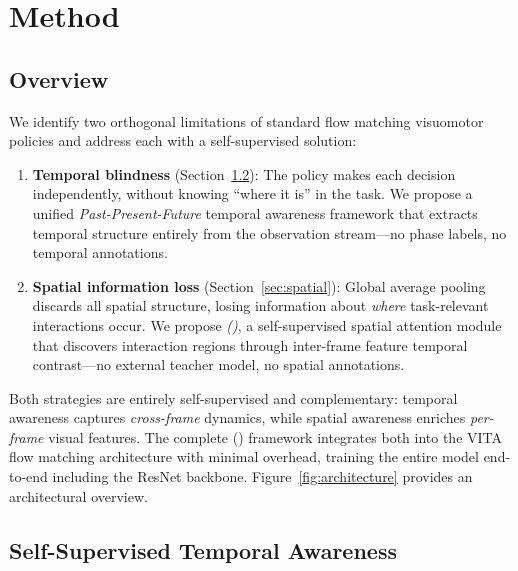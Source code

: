 \section{Method}
\label{sec:method}

\subsection{Overview}
\label{sec:method_overview}

We identify two orthogonal limitations of standard flow matching visuomotor policies and address each with a self-supervised solution:

\begin{enumerate}[leftmargin=*,itemsep=4pt]
    \item \textbf{Temporal blindness} (Section~\ref{sec:temporal}): The policy makes each decision independently, without knowing ``where it is'' in the task. We propose a unified \emph{Past-Present-Future} temporal awareness framework that extracts temporal structure entirely from the observation stream---no phase labels, no temporal annotations.

    \item \textbf{Spatial information loss} (Section~\ref{sec:spatial}): Global average pooling discards all spatial structure, losing information about \emph{where} task-relevant interactions occur. We propose \emph{\fasafull{} (\fasa{})}, a self-supervised spatial attention module that discovers interaction regions through inter-frame feature temporal contrast---no external teacher model, no spatial annotations.
\end{enumerate}

Both strategies are entirely self-supervised and complementary: temporal awareness captures \emph{cross-frame} dynamics, while spatial awareness enriches \emph{per-frame} visual features. The complete \method{} (\methodfull{}) framework integrates both into the VITA flow matching architecture with minimal overhead, training the entire model end-to-end including the ResNet backbone. Figure~\ref{fig:architecture} provides an architectural overview.

\subsection{Self-Supervised Temporal Awareness}
\label{sec:temporal}

